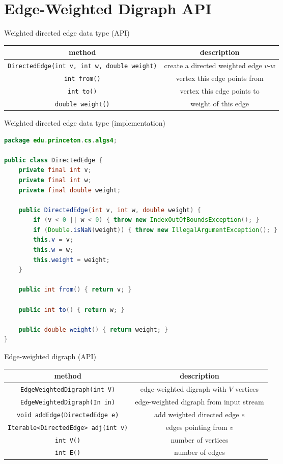 \documentclass[8pt,a4paper,compress]{beamer}
\begin{document}
\section{Edge-Weighted Digraph API}
\begin{frame}[fragile]
\pause

Weighted directed edge data type (API)
\begin{center}
\begin{tabular}{cc}
method & description \\ \hline
\lstinline$DirectedEdge(int v, int w, double weight)$ & create a directed weighted edge $v$-$w$ \\
\lstinline$int from()$ & vertex this edge points from \\
\lstinline$int to()$ & vertex this edge points to \\
\lstinline$double weight()$ & weight of this edge
\end{tabular}  
\end{center}

\pause
\bigskip

Weighted directed edge data type (implementation)
\begin{lstlisting}[language=Java]
package edu.princeton.cs.algs4;

public class DirectedEdge { 
    private final int v;
    private final int w;
    private final double weight;
    
    public DirectedEdge(int v, int w, double weight) {
        if (v < 0 || w < 0) { throw new IndexOutOfBoundsException(); }
        if (Double.isNaN(weight)) { throw new IllegalArgumentException(); }
        this.v = v;
        this.w = w;
        this.weight = weight;
    }

    public int from() { return v; }

    public int to() { return w; }

    public double weight() { return weight; }
}
\end{lstlisting}
\end{frame}

\begin{frame}[fragile]
\pause

Edge-weighted digraph (API)
\begin{center}
\begin{tabular}{cc}
method & description \\ \hline
\lstinline$EdgeWeightedDigraph(int V)$ & edge-weighted digraph with $V$ vertices \\
\lstinline$EdgeWeightedDigraph(In in)$ & edge-weighted digraph from input stream \\
\lstinline$void addEdge(DirectedEdge e)$ & add weighted directed edge $e$ \\
\lstinline$Iterable<DirectedEdge> adj(int v)$ & edges pointing from $v$ \\
\lstinline$int V()$ & number of vertices \\
\lstinline$int E()$ & number of edges \\
\end{tabular}  
\end{center}
\end{frame}
\end{document}
